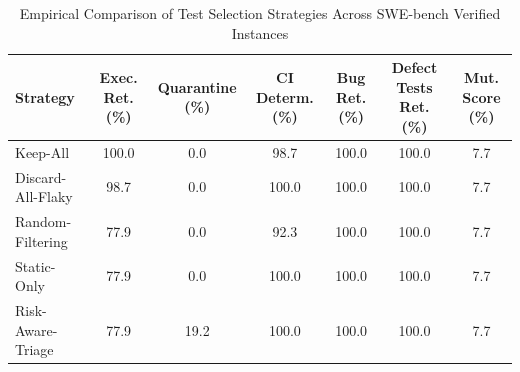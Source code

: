 \begin{table}[t]
\centering
\caption{Empirical Comparison of Test Selection Strategies Across SWE-bench Verified Instances}
\label{tab:strategy_comparison}
\begin{tabular}{lcccccc}
\toprule
\textbf{Strategy} & \textbf{Exec. Ret. (\%)} & \textbf{Quarantine (\%)} & \textbf{CI Determ. (\%)} & \textbf{Bug Ret. (\%)} & \textbf{Defect Tests Ret. (\%)} & \textbf{Mut. Score (\%)} \\
\midrule
Keep-All & 100.0 & 0.0 & 98.7 & 100.0 & 100.0 & 7.7 \\
Discard-All-Flaky & 98.7 & 0.0 & 100.0 & 100.0 & 100.0 & 7.7 \\
Random-Filtering & 77.9 & 0.0 & 92.3 & 100.0 & 100.0 & 7.7 \\
Static-Only & 77.9 & 0.0 & 100.0 & 100.0 & 100.0 & 7.7 \\
Risk-Aware-Triage & 77.9 & 19.2 & 100.0 & 100.0 & 100.0 & 7.7 \\
\bottomrule
\end{tabular}
\end{table}